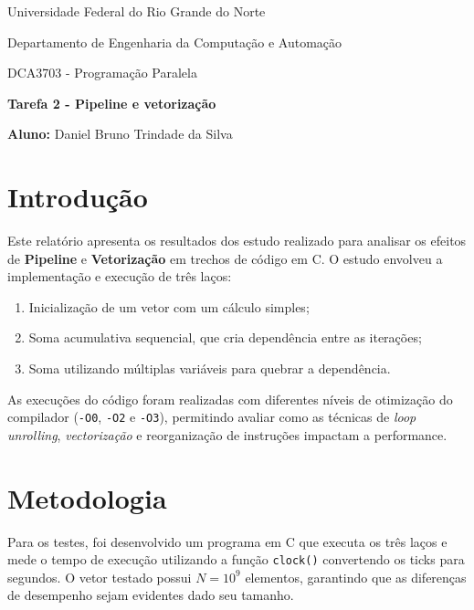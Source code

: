 \documentclass[a4paper, 12pt]{article}
\begin{document}
	\begin{center}
		Universidade Federal do Rio Grande do Norte
		
		Departamento de Engenharia da Computação e Automação
		
		DCA3703 - Programação Paralela
	
		\textbf{Tarefa 2 - Pipeline e vetorização}
		
		\textbf{Aluno:} Daniel Bruno Trindade da Silva
	\end{center}
	
	\section{Introdução}
	Este relatório apresenta os resultados dos estudo realizado para analisar os efeitos de \textbf{Pipeline} e \textbf{Vetorização} em trechos de código em C. O estudo envolveu a implementação e execução de três laços:
	\begin{enumerate}
		\item Inicialização de um vetor com um cálculo simples;
		\item Soma acumulativa sequencial, que cria dependência entre as iterações;
		\item Soma utilizando múltiplas variáveis para quebrar a dependência.
	\end{enumerate}
	As execuções do código foram realizadas com diferentes níveis de otimização do compilador (\texttt{-O0}, \texttt{-O2} e \texttt{-O3}), permitindo avaliar como as técnicas de \emph{loop unrolling}, \emph{vectorização} e reorganização de instruções impactam a performance.
	
	\section{Metodologia}
	Para os testes, foi desenvolvido um programa em C que executa os três laços e mede o tempo de execução utilizando a função \texttt{clock()} convertendo os ticks para segundos. O vetor testado possui \(N = 10^9\) elementos, garantindo que as diferenças de desempenho sejam evidentes dado seu tamanho.
	
\end{document}
